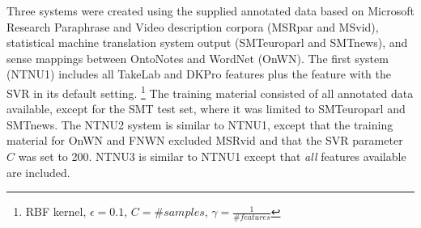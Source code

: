Three systems were created using the supplied annotated data based on Microsoft Research Paraphrase and Video description corpora (MSRpar and MSvid), statistical machine translation system output (SMTeuroparl and SMTnews), and sense mappings between OntoNotes and WordNet (OnWN).
The first system (NTNU1) includes all TakeLab and DKPro features 
plus the  feature with the SVR in its default setting.%
\footnote{RBF kernel, $\epsilon=0.1$, $C=\#samples$, $\gamma=\frac{1}{\#features}$}  
The training material consisted of all annotated data available, 
except for the SMT test set, where it was limited to SMT\-europarl and SMT\-news. 
The NTNU2 system is similar to NTNU1, except that the training material for OnWN and FNWN 
excluded MSRvid and that the SVR parameter $C$ was set to 200. 
NTNU3 is similar to NTNU1 except that {\em all\/} features available are included.
